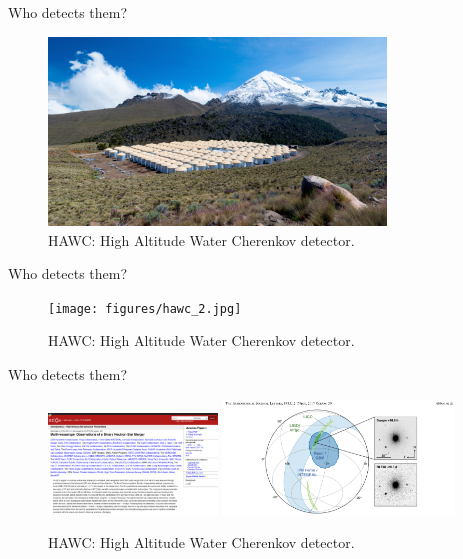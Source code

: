 \documentclass{beamer}
\begin{document}
\begin{frame}{Who detects them?}
\begin{figure}
\centering
\includegraphics[width=0.8\textwidth]{figures/hawc_1.jpg}
\caption{\label{fig:y1} HAWC: High Altitude Water Cherenkov detector.}
\end{figure}
\end{frame}

\begin{frame}{Who detects them?}
\begin{figure}
\centering
\texttt{[image: figures/hawc\_2.jpg]}
\caption{\label{fig:y2} HAWC: High Altitude Water Cherenkov detector.}
\end{figure}
\end{frame}

\begin{frame}{Who detects them?}
\begin{figure}
\centering
\includegraphics[width=0.4\textwidth]{figures/hawc_5.png}
\includegraphics[width=0.55\textwidth]{figures/hawc_6.png}
\caption{\label{fig:y3} HAWC: High Altitude Water Cherenkov detector.}
\end{figure}
\end{frame}
\end{document}
